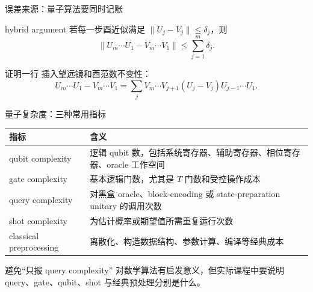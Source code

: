 \documentclass[aspectratio=169,10pt]{ctexbeamer}
\begin{document}
\begin{frame}{误差来源：量子算法要同时记账}
\begin{center}
\end{center}
\begin{keybox}{hybrid argument}
若每一步酉近似满足 $\|U_j-V_j\|\le\delta_j$，则
\[
\left\|U_m\cdots U_1-V_m\cdots V_1\right\|
\le \sum_{j=1}^m\delta_j.
\]
\end{keybox}
\begin{exbox}{证明一行}
插入望远镜和酉范数不变性：
\[
U_m\cdots U_1-V_m\cdots V_1=\sum_j V_m\cdots V_{j+1}(U_j-V_j)U_{j-1}\cdots U_1.
\]
\end{exbox}
\end{frame}

\begin{frame}{量子复杂度：三种常用指标}
\begin{center}
\renewcommand{\arraystretch}{1.2}
\begin{tabular}{p{}p{}}
\toprule
指标 & 含义\\
\midrule
qubit complexity & 逻辑 qubit 数，包括系统寄存器、辅助寄存器、相位寄存器、oracle 工作空间\\
gate complexity & 基本逻辑门数，尤其是 $T$ 门数和受控操作成本\\
query complexity & 对黑盒 oracle、block-encoding 或 state-preparation unitary 的调用次数\\
shot complexity & 为估计概率或期望值所需重复运行次数\\
classical preprocessing & 离散化、构造数据结构、参数计算、编译等经典成本\\
\bottomrule
\end{tabular}
\end{center}
\begin{warnbox}{避免“只报 query complexity”}
对数学算法有启发意义，但实际课程中要说明 query、gate、qubit、shot 与经典预处理分别是什么。
\end{warnbox}
\end{frame}
\end{document}
